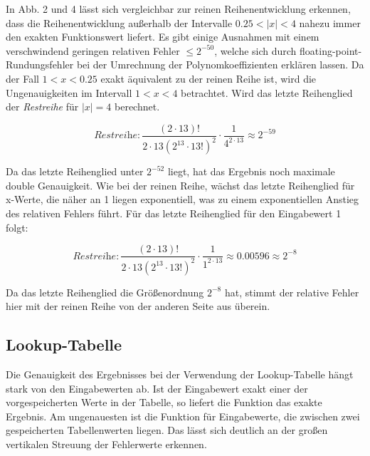 \documentclass[course=erap] {aspdoc}
\begin{document}
{    In Abb. 2 und 4 lässt sich vergleichbar zur reinen Reihenentwicklung erkennen, dass die Reihenentwicklung außerhalb der Intervalle $0.25<|x|<4$ nahezu immer den exakten Funktionswert liefert.
    Es gibt einige Ausnahmen mit einem verschwindend geringen relativen Fehler $\leq2^{-50}$, welche sich durch floating-point-Rundungsfehler bei der Umrechnung der Polynomkoeffizienten erklären lassen.
    Da der Fall $1<x<0.25$ exakt äquivalent zu der reinen Reihe ist, wird die Ungenauigkeiten im Intervall $1<x<4$ betrachtet.
    Wird das letzte Reihenglied der \textit{Restreihe} für $|x|=4$ berechnet.

    \[
        \textit{Restreihe}: \frac{(2\cdot13)!}{2\cdot13(2^{13}\cdot 13!)^2} \cdot \frac{1}{4^{2\cdot13}} \approx 2^{-59}
    \]

    Da das letzte Reihenglied unter $2^{-52}$ liegt, hat das Ergebnis noch maximale double Genauigkeit.
    Wie bei der reinen Reihe, wächst das letzte Reihenglied für x-Werte, die näher an 1 liegen exponentiell, was zu einem exponentiellen Anstieg des relativen Fehlers führt.
    Für das letzte Reihenglied für den Eingabewert 1 folgt:

    \[
        \textit{Restreihe}: \frac{(2\cdot13)!}{2\cdot13(2^{13}\cdot 13!)^2} \cdot \frac{1}{1^{2\cdot13}} \approx 0.00596 \approx 2^{-8}
    \]

    Da das letzte Reihenglied die Größenordnung $2^{-8}$ hat, stimmt der relative Fehler hier mit der reinen Reihe von der anderen Seite aus überein.

    \subsection{Lookup-Tabelle}\label{subsec:lookup-tabelle}

    Die Genauigkeit des Ergebnisses bei der Verwendung der Lookup-Tabelle hängt stark von den Eingabewerten ab.
    Ist der Eingabewert exakt einer der vorgespeicherten Werte in der Tabelle, so liefert die Funktion das exakte Ergebnis.
    Am ungenauesten ist die Funktion für Eingabewerte, die zwischen zwei gespeicherten Tabellenwerten liegen.
    Das lässt sich deutlich an der großen vertikalen Streuung der Fehlerwerte erkennen.

}
\end{document}
